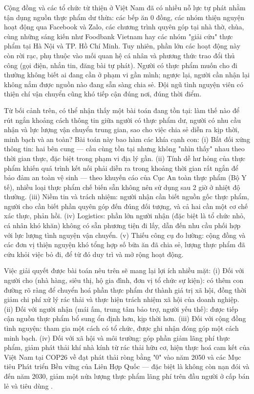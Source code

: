 \documentclass[../main.tex]{subfiles}%
\begin{document}
Cộng đồng và các tổ chức từ thiện ở Việt Nam đã có nhiều nỗ lực tự phát nhằm tận dụng nguồn thực phẩm dư thừa: các bếp ăn 0 đồng, các nhóm thiện nguyện hoạt động qua Facebook và Zalo, các chương trình quyên góp tại nhà thờ, chùa, cùng những sáng kiến như Foodbank Vietnam \cite{FoodBankVietnam_Home} hay các nhóm "giải cứu" thực phẩm tại Hà Nội và TP. Hồ Chí Minh. Tuy nhiên, phần lớn các hoạt động này còn rời rạc, phụ thuộc vào mối quan hệ cá nhân và phương thức trao đổi thủ công (gọi điện, nhắn tin, đăng bài tự phát). Người có thực phẩm muốn cho đi thường không biết ai đang cần ở phạm vi gần mình; ngược lại, người cần nhận lại không nắm được nguồn nào đang sẵn sàng chia sẻ. Đội ngũ tình nguyện viên có thiện chí vận chuyển cũng khó tiếp cận đúng nơi, đúng thời điểm.

Từ bối cảnh trên, có thể nhận thấy một bài toán đang tồn tại: làm thế nào để rút ngắn khoảng cách thông tin giữa người có thực phẩm dư, người có nhu cầu nhận và lực lượng vận chuyển trung gian, sao cho việc chia sẻ diễn ra kịp thời, minh bạch và an toàn? Bài toán này bao hàm các khía cạnh con: (i) Bất đối xứng thông tin: hai bên cung — cầu cùng tồn tại nhưng không "nhìn thấy" nhau theo thời gian thực, đặc biệt trong phạm vi địa lý gần. (ii) Tính dễ hư hỏng của thực phẩm khiến quá trình kết nối phải diễn ra trong khoảng thời gian rất ngắn để bảo đảm an toàn vệ sinh — theo khuyến cáo của Cục An toàn thực phẩm (Bộ Y tế), nhiều loại thực phẩm chế biến sẵn không nên sử dụng sau 2 giờ ở nhiệt độ thường. \cite{USDA_DangerZone} (iii) Niềm tin và trách nhiệm: người nhận cần biết nguồn gốc thực phẩm, người cho cần biết phần quyên góp đến đúng đối tượng, và cả hai cần một cơ chế xác thực, phản hồi. (iv) Logistics: phần lớn người nhận (đặc biệt là tổ chức nhỏ, cá nhân khó khăn) không có sẵn phương tiện đi lấy, dẫn đến nhu cầu phối hợp với lực lượng tình nguyện vận chuyển. (v) Thiếu công cụ đo lường: cộng đồng và các đơn vị thiện nguyện khó tổng hợp số bữa ăn đã chia sẻ, lượng thực phẩm đã cứu khỏi việc bỏ đi, để từ đó duy trì và mở rộng hoạt động.

Việc giải quyết được bài toán nêu trên sẽ mang lại lợi ích nhiều mặt: (i) Đối với người cho (nhà hàng, siêu thị, hộ gia đình, đơn vị tổ chức sự kiện): có thêm con đường rõ ràng để chuyển hoá phần thực phẩm dư thành giá trị xã hội, đồng thời giảm chi phí xử lý rác thải và thực hiện trách nhiệm xã hội của doanh nghiệp. (ii) Đối với người nhận (mái ấm, trung tâm bảo trợ, người yếu thế): được tiếp cận nguồn thực phẩm bổ sung ổn định hơn, kịp thời hơn. (iii) Đối với cộng đồng tình nguyện: tham gia một cách có tổ chức, được ghi nhận đóng góp một cách minh bạch. (iv) Đối với xã hội và môi trường: góp phần giảm lãng phí thực phẩm, giảm phát thải khí nhà kính từ rác thải hữu cơ, hiện thực hoá cam kết của Việt Nam tại COP26 về đạt phát thải ròng bằng "0" vào năm 2050 \cite{BoCongThuong_COP26} và các Mục tiêu Phát triển Bền vững của Liên Hợp Quốc — đặc biệt là không còn nạn đói và đến năm 2030, giảm một nửa lượng thực phẩm lãng phí trên đầu người ở cấp bán lẻ và tiêu dùng \cite{UN_Agenda2030}.
\end{document}
